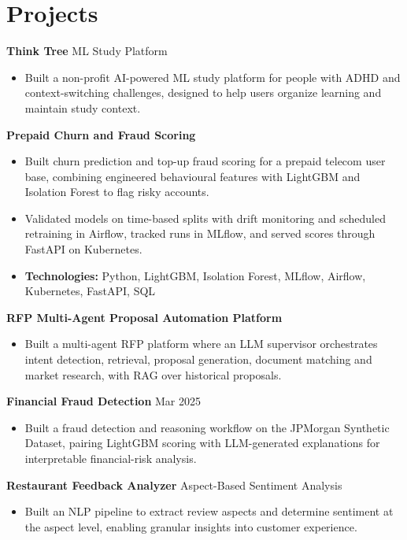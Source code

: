 \documentclass[10pt,a4paper]{article}
\begin{document}
\section{Projects}
\textbf{Think Tree} \textbar{} ML Study Platform\par
\begin{itemize}
  \item Built a non-profit AI-powered ML study platform for people with ADHD and context-switching challenges, designed to help users organize learning and maintain study context.
\end{itemize}
\textbf{Prepaid Churn and Fraud Scoring}\par
\begin{itemize}
  \item Built churn prediction and top-up fraud scoring for a prepaid telecom user base, combining engineered behavioural features with LightGBM and Isolation Forest to flag risky accounts.
  \item Validated models on time-based splits with drift monitoring and scheduled retraining in Airflow, tracked runs in MLflow, and served scores through FastAPI on Kubernetes.
  \item \textbf{Technologies:} Python, LightGBM, Isolation Forest, MLflow, Airflow, Kubernetes, FastAPI, SQL
\end{itemize}
\textbf{RFP Multi-Agent Proposal Automation Platform}\par
\begin{itemize}
  \item Built a multi-agent RFP platform where an LLM supervisor orchestrates intent detection, retrieval, proposal generation, document matching and market research, with RAG over historical proposals.
\end{itemize}
\textbf{Financial Fraud Detection} \textbar{} Mar 2025\par
\begin{itemize}
  \item Built a fraud detection and reasoning workflow on the JPMorgan Synthetic Dataset, pairing LightGBM scoring with LLM-generated explanations for interpretable financial-risk analysis.
\end{itemize}
\textbf{Restaurant Feedback Analyzer} \textbar{} Aspect-Based Sentiment Analysis\par
\begin{itemize}
  \item Built an NLP pipeline to extract review aspects and determine sentiment at the aspect level, enabling granular insights into customer experience.
\end{itemize}
\end{document}
